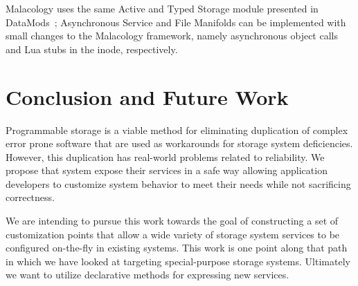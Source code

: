 \documentclass[10pt,twocolumn]{article}
\begin{document}
Malacology uses the same Active and Typed Storage module presented in
DataMods~\cite{watkins_datamods_2012}; Asynchronous Service and File
Manifolds can be implemented with small changes to the Malacology
framework, namely asynchronous object calls and Lua stubs in the inode,
respectively.

\section{Conclusion and Future Work}\label{conclusion-and-future-work}

Programmable storage is a viable method for eliminating duplication of complex
error prone software that are used as workarounds for storage system
deficiencies. However, this duplication has real-world problems related to
reliability. We propose that system expose their services in a safe way
allowing application developers to customize system behavior to meet their
needs while not sacrificing correctness.

We are intending to pursue this work towards the goal of constructing a set of
customization points that allow a wide variety of storage system services to be
configured on-the-fly in existing systems. This work is one point along that
path in which we have looked at targeting special-purpose storage systems.
Ultimately we want to utilize declarative methods for expressing new services.



\end{document}
